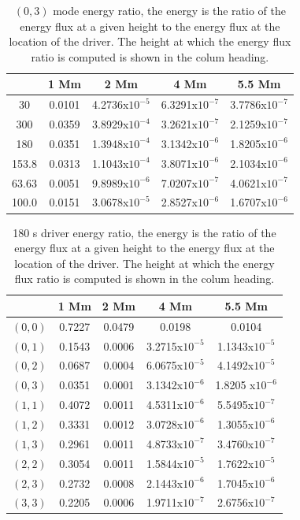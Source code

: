 \documentclass[preprint,authoryear,12pt]{elsarticle}
\begin{document}
\begin{table}[h]
\centering
\begin{tabular}{c c c c c }
\hline
   &  1 Mm & 2 Mm & 4 Mm & 5.5 Mm \\
\hline
30 &  0.0101 &  4.2736x$10^{-5}$ & 6.3291x$10^{-7}$ & 3.7786x$10^{-7}$\\
\hline
300 & 0.0359 & 3.8929x$10^{-4}$ & 3.2621x$10^{-7}$ & 2.1259x$10^{-7}$\\
\hline
180 & 0.0351 &1.3948x$10^{-4}$ & 3.1342x$10^{-6}$ & 1.8205x$10^{-6}$\\
\hline
153.8 & 0.0313 & 1.1043x$10^{-4}$ & 3.8071x$10^{-6}$ & 2.1034x$10^{-6}$\\
\hline
63.63 & 0.0051 & 9.8989x$10^{-6}$ & 7.0207x$10^{-7}$ & 4.0621x$10^{-7}$\\
\hline
100.0 & 0.0151 & 3.0678x$10^{-5}$ & 2.8527x$10^{-6}$ & 1.6707x$10^{-6}$\\
\hline
\end{tabular} 
\caption{$(0, 3)$ mode energy ratio, the energy is the ratio of the energy flux at a given height to the energy flux at the location of the driver. The height at which the energy flux ratio is computed is shown in the colum heading.}
\label{Table03mode}
\end{table}

\begin{table}[h]
\centering
\begin{tabular}{c c c c c }
\hline
   &  1 Mm & 2 Mm & 4 Mm & 5.5 Mm \\
\hline
$(0, 0)$ &  0.7227 & 0.0479 & 0.0198 & 0.0104 \\
\hline
$(0, 1)$ & 0.1543 & 0.0006 & 3.2715x$10^{-5}$ &  1.1343x$10^{-5}$\\
\hline
$(0, 2)$ & 0.0687 & 0.0004 & 6.0675x$10^{-5}$ &  4.1492x$10^{-5}$\\
\hline
$(0, 3)$ & 0.0351 & 0.0001 & 3.1342x$10^{-6}$ & 1.8205 x$10^{-6}$\\
\hline
$(1, 1)$ & 0.4072 & 0.0011 & 4.5311x$10^{-6}$ &  5.5495x$10^{-7}$\\
\hline
$(1, 2)$ & 0.3331 & 0.0012 & 3.0728x$10^{-6}$ &  1.3055x$10^{-6}$\\
\hline
$(1, 3)$ & 0.2961 & 0.0011 & 4.8733x$10^{-7}$ &  3.4760x$10^{-7}$\\
\hline
$(2, 2)$ & 0.3054 & 0.0011 & 1.5844x$10^{-5}$ &  1.7622x$10^{-5}$\\
\hline
$(2, 3)$ & 0.2732 & 0.0008 & 2.1443x$10^{-6}$ &  1.7045x$10^{-6}$\\
\hline
$(3, 3)$ & 0.2205 & 0.0006 & 1.9711x$10^{-7}$ &  2.6756x$10^{-7}$\\
\hline
\end{tabular} 
\caption{180 s driver energy ratio, the energy is the ratio of the energy flux at a given height to the energy flux at the location of the driver. The height at which the energy flux ratio is computed is shown in the colum heading.}
\label{Table180mode}
\end{table}
\end{document}
